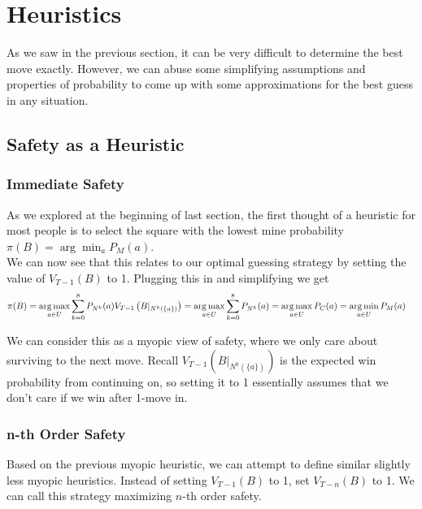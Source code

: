 \section{Heuristics}

As we saw in the previous section, it can be very difficult to determine the best move exactly. However, we can abuse some simplifying assumptions and properties of probability to come up with some approximations for the best guess in any situation.

\subsection{Safety as a Heuristic}
\subsubsection*{Immediate Safety}
As we explored at the beginning of last section, the first thought of a heuristic for most people is to select the square with the lowest mine probability $\pi(B)=\arg\min_aP_M(a)$.\\

We can now see that this relates to our optimal guessing strategy by setting the value of $V_{T-1}(B)$ to 1. Plugging this in and simplifying we get\begin{align*}
    \pi(B)&=\mathop{\mathrm{arg\,max}}\limits_{a\in U}\sum_{k=0}^8P_{N^k}(a)V_{T-1}\left(B|_{N^k({\{a\}})}\right)=\mathop{\mathrm{arg\,max}}\limits_{a\in U}\sum_{k=0}^8P_{N^k}(a)=\mathop{\mathrm{arg\,max}}\limits_{a\in U}P_{C}(a)=\mathop{\mathrm{arg\,min}}\limits_{a\in U}P_M(a)
\end{align*}

We can consider this as a myopic view of safety, where we only care about surviving to the next move. Recall $V_{T-1}(B|_{N^k(\{a\})})$ is the expected win probability from continuing on, so setting it to 1 essentially assumes that we don't care if we win after 1-move in.\\

\subsubsection*{n-th Order Safety}
Based on the previous myopic heuristic, we can attempt to define similar slightly less myopic heuristics. Instead of setting $V_{T-1}(B)$ to 1, set $V_{T-n}(B)$ to 1. We can call this strategy maximizing $n$-th order safety.
\phantom{.}


